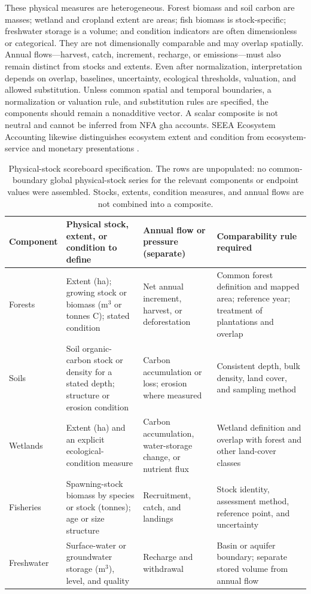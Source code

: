 \documentclass[11pt,a4paper]{article}
\begin{document}
These physical measures are heterogeneous. Forest biomass and soil carbon are masses; wetland and cropland extent are areas; fish biomass is stock-specific; freshwater storage is a volume; and condition indicators are often dimensionless or categorical. They are not dimensionally comparable and may overlap spatially. Annual flows—harvest, catch, increment, recharge, or emissions—must also remain distinct from stocks and extents. Even after normalization, interpretation depends on overlap, baselines, uncertainty, ecological thresholds, valuation, and allowed substitution. Unless common spatial and temporal boundaries, a normalization or valuation rule, and substitution rules are specified, the components should remain a nonadditive vector. A scalar composite is not neutral and cannot be inferred from NFA gha accounts. SEEA Ecosystem Accounting likewise distinguishes ecosystem extent and condition from ecosystem-service and monetary presentations \citep{UN2021SEEA_EA}.

\begin{table}[htbp]
\centering\footnotesize
\caption{Physical-stock scoreboard specification. The rows are unpopulated: no common-boundary global physical-stock series for the relevant components or endpoint values were assembled. Stocks, extents, condition measures, and annual flows are not combined into a composite.}
\label{tab:si_stock_scoreboard}
\begin{tabularx}{\textwidth}{@{}>{\raggedright\arraybackslash}p{} >{\raggedright\arraybackslash}p{} >{\raggedright\arraybackslash}p{} >{\raggedright\arraybackslash}X@{}}
\toprule
Component & Physical stock, extent, or condition to define & Annual flow or pressure (separate) & Comparability rule required \\
\midrule
Forests & Extent (ha); growing stock or biomass (m$^3$ or tonnes C); stated condition & Net annual increment, harvest, or deforestation & Common forest definition and mapped area; reference year; treatment of plantations and overlap \\
Soils & Soil organic-carbon stock or density for a stated depth; structure or erosion condition & Carbon accumulation or loss; erosion where measured & Consistent depth, bulk density, land cover, and sampling method \\
Wetlands & Extent (ha) and an explicit ecological-condition measure & Carbon accumulation, water-storage change, or nutrient flux & Wetland definition and overlap with forest and other land-cover classes \\
Fisheries & Spawning-stock biomass by species or stock (tonnes); age or size structure & Recruitment, catch, and landings & Stock identity, assessment method, reference point, and uncertainty \\
Freshwater & Surface-water or groundwater storage (m$^3$), level, and quality & Recharge and withdrawal & Basin or aquifer boundary; separate stored volume from annual flow \\
\bottomrule
\end{tabularx}
\end{table}
\end{document}
